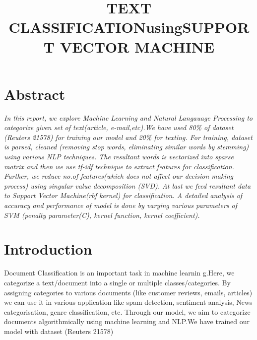 \documentclass{report}
\begin{document}
{ \doublespacing
{}
\tableofcontents %

\pagebreak
\listoffigures %
\pagebreak
\listoftables %
\pagebreak

}

\title{\Huge  TEXT CLASSIFICATION\linebreak using\linebreak SUPPORT VECTOR MACHINE}
\date{}
\maketitle
\setcounter{tocdepth}{5} 	
\setlength{\columnsep}{0.7cm}
\section{\Huge Abstract}
\par \Large \textit{{In this report, we explore Machine Learning and Natural Langauage Processing to categorize given set of text(article, e-mail,etc).We have used 80\% of dataset (Reuters 21578) for training our model and 20\% for texting. For training, dataset is parsed, cleaned (removing stop words, eliminating similar words by stemming) using various NLP techniques. The resultant words is vectorized into sparse matrix and then we use tf-idf technique to extract features for classification. Further, we reduce no.of features(which does not affect our decision making process) using singular value decomposition (SVD). At last we feed resultant data to Support Vector Machine(rbf kernel) for classification. A detailed analysis of accuracy and performance of model is done by varying various parameters of SVM (penalty parameter(C), kernel function, kernel coefficient).}}
\section{\Huge Introduction}

\par \Large Document Classification is an important task in machine learnin g.Here, we categorize a text/document into a single or multiple classes/categories.
By assigning categories to various documents (like customer reviews, emails, articles) we can use it in various application like spam detection, sentiment analysis, News categorisation, genre classification, etc.
Through our model, we aim to  categorize documents  algorithmically using machine learning and NLP.We have trained our model with dataset (Reuters 21578)
\end{document}
